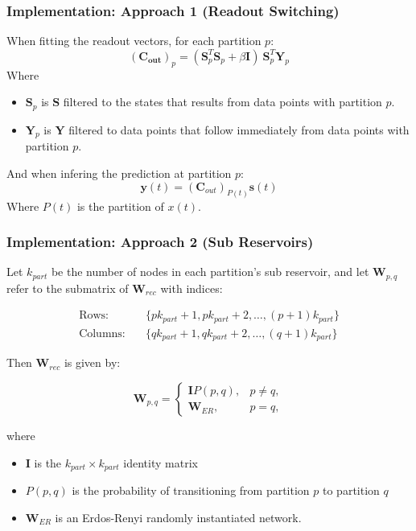 \documentclass{beamer}
\begin{document}
\begin{frame}
    \frametitle{Implementation: Approach 1 (Readout Switching)}
    When fitting the readout vectors, for each partition $p$:
    \[
        (\mathbf{C_{out}})_p = (\mathbf{S}_p^T \mathbf{S}_p + \beta \mathbf{I}) \ \mathbf{S}_p^T \mathbf{Y}_p
    \]
    Where
    \begin{itemize}
        \item $\mathbf{S}_p$ is $\mathbf{S}$ filtered to the states that results from data points with partition $p$. 
        \item $\mathbf{Y}_{p}$ is $\mathbf{Y}$ filtered to data points that follow immediately from data points with partition $p$.
    \end{itemize}
    And when infering the prediction at partition $p$:
    \[
        \mathbf{y}(t) = (\mathbf{C}_{out})_{P(t)}\mathbf{s}(t)
    \]
    Where $P(t)$ is the partition of $x(t)$.
\end{frame}

\begin{frame}
    \frametitle{Implementation: Approach 2 (Sub Reservoirs)}

    Let $k_{part}$ be the number of nodes in each partition's sub reservoir,
    and let $\mathbf{W}_{p,q}$ refer to the submatrix of $\mathbf{W}_{rec}$ with indices:
    
    \begin{align*}
        \text{Rows:}\quad& \{ pk_{part} + 1, pk_{part} + 2, \dots, (p+1)k_{part} \} \\
        \text{Columns:}\quad& \{ qk_{part} + 1, qk_{part} + 2, \dots, (q+1)k_{part} \}
    \end{align*}
    

    Then $\mathbf{W}_{rec}$ is given by:

    \[
    \mathbf{W}_{p,q} =
    \begin{cases}
    \mathbf{I} P(p,q), & p \neq q, \\
    \mathbf{W}_{ER}, & p = q,
    \end{cases}
    \]

    where 
    \begin{itemize}
        \item \(\mathbf{I}\) is the \( k_{part} \times k_{part} \) identity matrix
        \item \( P(p,q) \) is the probability of transitioning from partition \( p \) to partition \( q \)
        \item $\mathbf{W}_{ER}$ is an Erdos-Renyi randomly instantiated network.
    \end{itemize}
\end{frame}
\end{document}
